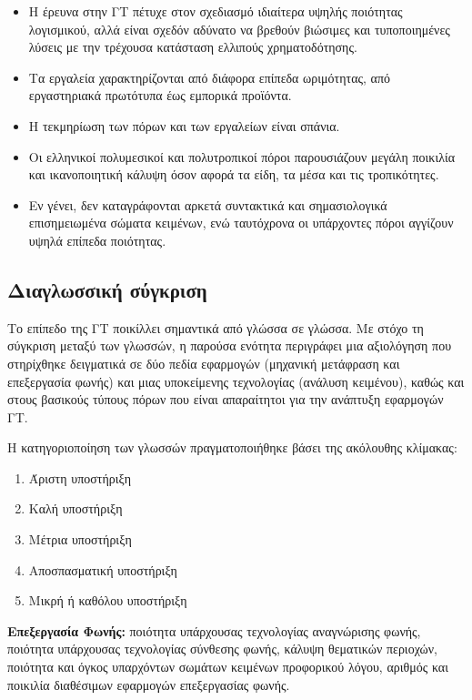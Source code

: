 \begin{multicols}{2}
\begin{itemize}
\item Η έρευνα στην ΓΤ πέτυχε στον σχεδιασμό ιδιαίτερα υψηλής ποιότητας λογισμικού, αλλά είναι σχεδόν αδύνατο να βρεθούν βιώσιμες και τυποποιημένες λύσεις με την τρέχουσα κατάσταση ελλιπούς χρηματοδότησης.
\columnbreak
\item Τα εργαλεία χαρακτηρίζονται από διάφορα επίπεδα ωριμότητας, από εργαστηριακά πρωτότυπα έως εμπορικά προϊόντα.
\item Η τεκμηρίωση των πόρων και των εργαλείων είναι σπάνια.
\item Οι ελληνικοί πολυμεσικοί και πολυτροπικοί πόροι παρουσιάζουν μεγάλη ποικιλία και ικανοποιητική κάλυψη όσον αφορά τα είδη, τα μέσα και τις τροπικότητες.
\item Εν γένει, δεν καταγράφονται αρκετά συντακτικά και σημασιολογικά επισημειωμένα σώματα κειμένων, ενώ ταυτόχρονα οι υπάρχοντες πόροι αγγίζουν υψηλά επίπεδα ποιότητας.	
\end{itemize}

\subsection{Διαγλωσσική σύγκριση}

Το επίπεδο της ΓΤ ποικίλλει σημαντικά από γλώσσα σε γλώσσα. Με στόχο τη σύγκριση μεταξύ των γλωσσών, η παρούσα ενότητα περιγράφει μια αξιολόγηση που στηρίχθηκε δειγματικά σε δύο πεδία εφαρμογών (μηχανική μετάφραση και επεξεργασία φωνής) και μιας υποκείμενης τεχνολογίας (ανάλυση κειμένου), καθώς και στους βασικούς τύπους πόρων που είναι απαραίτητοι για την ανάπτυξη εφαρμογών ΓΤ.

Η κατηγοριοποίηση των γλωσσών πραγματοποιήθηκε βάσει της ακόλουθης κλίμακας:

\begin{enumerate}
\item Άριστη υποστήριξη
\item Καλή υποστήριξη
\item Μέτρια υποστήριξη
\item Αποσπασματική υποστήριξη
\item Μικρή ή καθόλου υποστήριξη
\end{enumerate}

\textbf{Επεξεργασία Φωνής:} ποιότητα υπάρχουσας τεχνολογίας αναγνώρισης φωνής, ποιότητα υπάρχουσας τεχνολογίας σύνθεσης φωνής, κάλυψη θεματικών περιοχών, ποιότητα και όγκος υπαρχόντων σωμάτων κειμένων προφορικού λόγου, αριθμός και ποικιλία διαθέσιμων εφαρμογών επεξεργασίας φωνής.


\end{multicols}
